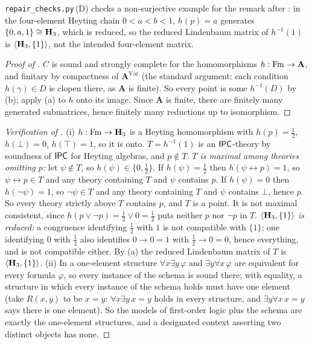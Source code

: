 \texttt{repair\_checks.py}\,(D) checks a non-surjective example for the remark after : in the four-element Heyting chain $0<a<b<1$, $h(p)=a$ generates $\{0,a,1\}\cong\mathbf{H}_3$, which is reduced, so the reduced Lindenbaum matrix of $h^{-1}(1)$ is $\langle\mathbf{H}_3,\{1\}\rangle$, not the intended four-element matrix.

\begin{proof}[Proof of ]
$C$ is sound and strongly complete for the homomorphisms $h:\mathrm{Fm}\to\mathbf A$, and finitary by compactness of $\mathbf A^{\mathrm{Var}}$ (the standard argument: each condition $h(\gamma)\in D$ is clopen there, as $\mathbf A$ is finite). So every point is some $h^{-1}(D)$ by (b); apply (a) to $h$ onto its image. Since $\mathbf A$ is finite, there are finitely many generated submatrices, hence finitely many reductions up to isomorphism.
\end{proof}

\begin{proof}[Verification of ]
(i) $h:\mathrm{Fm}\to\mathbf{H}_3$ is a Heyting homomorphism with $h(p)=\frac12$, $h(\bot)=0$, $h(\top)=1$, so it is onto. $T=h^{-1}(1)$ is an $\mathsf{IPC}$-theory by soundness of $\mathsf{IPC}$ for Heyting algebras, and $p\notin T$. \emph{$T$ is maximal among theories omitting $p$:} let $\psi\notin T$, so $h(\psi)\in\{0,\frac12\}$. If $h(\psi)=\frac12$ then $h(\psi\leftrightarrow p)=1$, so $\psi\leftrightarrow p\in T$ and any theory containing $T$ and $\psi$ contains $p$. If $h(\psi)=0$ then $h(\neg\psi)=1$, so $\neg\psi\in T$ and any theory containing $T$ and $\psi$ contains $\bot$, hence $p$. So every theory strictly above $T$ contains $p$, and $T$ is a point. It is not maximal consistent, since $h(p\vee\neg p)=\frac12\vee0=\frac12$ puts neither $p$ nor $\neg p$ in $T$. \emph{$\langle\mathbf{H}_3,\{1\}\rangle$ is reduced:} a congruence identifying $\frac12$ with $1$ is not compatible with $\{1\}$; one identifying $0$ with $\frac12$ also identifies $0\to0=1$ with $\frac12\to0=0$, hence everything, and is not compatible either. By (a) the reduced Lindenbaum matrix of $T$ is $\langle\mathbf{H}_3,\{1\}\rangle$.
(ii) In a one-element structure $\forall x\exists y\,\varphi$ and $\exists y\forall x\,\varphi$ are equivalent for every formula $\varphi$, so every instance of the schema is sound there; with equality, a structure in which every instance of the schema holds must have one element (take $R(x,y)$ to be $x=y$: $\forall x\exists y\,x=y$ holds in every structure, and $\exists y\forall x\,x=y$ says there is one element). So the models of first-order logic plus the schema are exactly the one-element structures, and a designated context asserting two distinct objects has none.
\end{proof}

